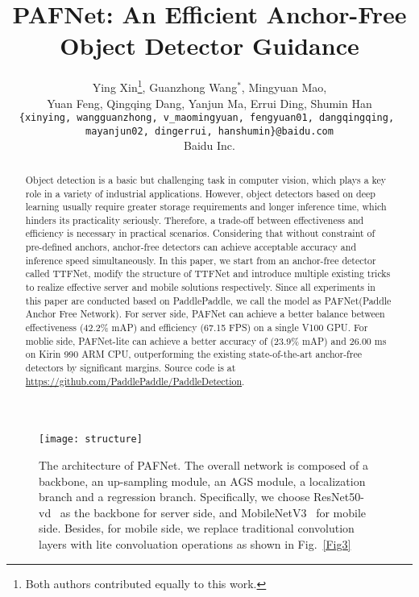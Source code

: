 \documentclass[10pt,twocolumn,letterpaper]{article}
\begin{document}
	
\title{PAFNet: An Efficient Anchor-Free Object Detector Guidance}
	\author{Ying Xin\thanks{Both authors contributed equally to this work.}, Guanzhong Wang$^*$, Mingyuan Mao, 
		   \\Yuan Feng, Qingqing Dang, Yanjun Ma, Errui Ding, Shumin Han \\

    {\tt\small\{xinying, wangguanzhong, v\_maomingyuan, fengyuan01, dangqingqing, }\\
     {\tt\small\ mayanjun02, dingerrui, hanshumin\}@baidu.com
    }
        \\ Baidu Inc.
    }
   
	
    \maketitle
\begin{abstract}
Object detection is a basic but challenging task in computer vision, which plays a key role in a variety of industrial applications. 
However, object detectors based on deep learning usually require greater storage requirements and longer inference time, which hinders its practicality seriously. Therefore, a trade-off between effectiveness and efficiency is necessary in practical scenarios. 
Considering that without constraint of pre-defined anchors, anchor-free detectors can achieve acceptable accuracy and inference speed simultaneously. In this paper, we start from an anchor-free detector called TTFNet, modify the structure of TTFNet and introduce multiple existing tricks to realize effective server and mobile solutions respectively.
Since all experiments in this paper are conducted based on PaddlePaddle, we call the model as PAFNet(Paddle Anchor Free Network). For server side, PAFNet can achieve a better balance between effectiveness (42.2\% mAP) and efficiency (67.15 FPS) on a single V100 GPU. For moblie side, PAFNet-lite can achieve a better accuracy of (23.9\% mAP) and 26.00 ms on Kirin 990 ARM CPU, outperforming the existing state-of-the-art anchor-free detectors by significant margins. Source code is at \url{https://github.com/PaddlePaddle/PaddleDetection}.
	\end{abstract}

	\begin{figure*}[]
\begin{center}
 		\centerline{\texttt{[image: structure]}}
		\caption{The architecture of PAFNet. The overall network is composed of a backbone, an up-sampling module, an AGS module, a localization branch and a regression branch. Specifically, we choose ResNet50-vd~\cite{ResNet16} as the backbone for server side, and MobileNetV3~\cite{mobilenetv3} for mobile side. Besides, for mobile side, we replace traditional convolution layers with lite convoluation operations as shown in Fig.~\ref{Fig3}}
		\label{Fig1}
	\end{center}
\end{figure*}
    
\end{document}
